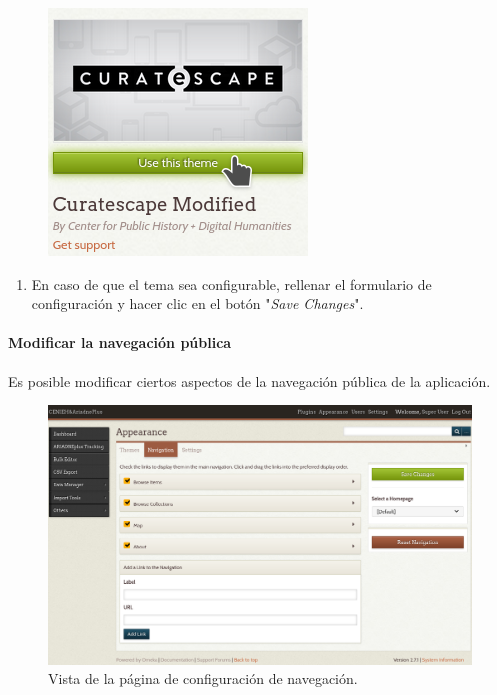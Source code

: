 \documentclass[
]{article}
\providecommand{\tightlist}{%
  \setlength{\itemsep}{0pt}\setlength{\parskip}{0pt}}
\begin{document}
\begin{figure}
\hypertarget{themes-inst}{%
\centering
\includegraphics{../_static/images/themes-inst.png}
\caption{}\label{themes-inst}
}
\end{figure}

\begin{enumerate}
\def\labelenumi{\arabic{enumi}.}
\setcounter{enumi}{4}
\tightlist
\item
  En caso de que el tema sea configurable, rellenar el formulario de
  configuración y hacer clic en el botón "\emph{Save Changes}".
\end{enumerate}

\hypertarget{modificar-la-navegaciuxf3n-puxfablica}{%
\paragraph{Modificar la navegación
pública}\label{modificar-la-navegaciuxf3n-puxfablica}}

Es posible modificar ciertos aspectos de la navegación pública de la
aplicación.

\begin{figure}
\hypertarget{nav-main}{%
\centering
\includegraphics{../_static/images/nav-main.png}
\caption{Vista de la página de configuración de
navegación.}\label{nav-main}
}
\end{figure}
\end{document}
